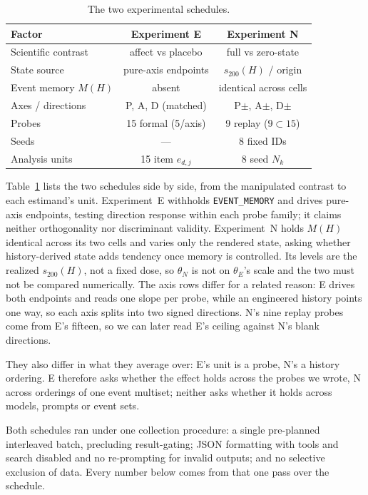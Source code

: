 \documentclass[sigconf]{acmart}
\begin{document}
\begin{table}[H]
  \caption{The two experimental schedules.}
  \label{tab:design}
  \centering
  \small
  \setlength{\tabcolsep}{3.2pt}
  \begin{tabular}{@{}lcc@{}}
    \toprule
    Factor & Experiment E & Experiment N \\
    \midrule
    Scientific contrast & affect vs placebo & full vs zero-state \\
    State source & pure-axis endpoints & $s_{200}(H)$ / origin \\
    Event memory $M(H)$ & absent & identical across cells \\
    Axes / directions & P, A, D (matched) & P$\pm$, A$\pm$, D$\pm$ \\
    Probes & 15 formal (5/axis) & 9 replay ($9\subset15$) \\
    Seeds & --- & 8 fixed IDs \\
    Analysis units & 15 item $e_{d,j}$ & 8 seed $N_k$ \\
    \bottomrule
  \end{tabular}
\end{table}

Table~\ref{tab:design} lists the two schedules side by side, from the manipulated contrast to each estimand's unit. Experiment~E withholds \texttt{EVENT\_MEMORY} and drives pure-axis endpoints, testing direction response within each probe family; it claims neither orthogonality nor discriminant validity. Experiment~N holds $M(H)$ identical across its two cells and varies only the rendered state, asking whether history-derived state adds tendency once memory is controlled. Its levels are the realized $s_{200}(H)$, not a fixed dose, so $\theta_N$ is not on $\theta_E$'s scale and the two must not be compared numerically. The axis rows differ for a related reason: E drives both endpoints and reads one slope per probe, while an engineered history points one way, so each axis splits into two signed directions. N's nine replay probes come from E's fifteen, so we can later read E's ceiling against N's blank directions.

They also differ in what they average over: E's unit is a probe, N's a history ordering. E therefore asks whether the effect holds across the probes we wrote, N across orderings of one event multiset; neither asks whether it holds across models, prompts or event sets.

Both schedules ran under one collection procedure: a single pre-planned interleaved batch, precluding result-gating; JSON formatting with tools and search disabled and no re-prompting for invalid outputs; and no selective exclusion of data. Every number below comes from that one pass over the schedule.
\end{document}
